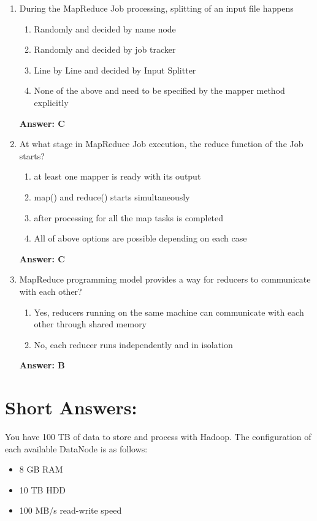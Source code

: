 \documentclass[12pt]{article}
\begin{document}
\begin{enumerate}
\item During the MapReduce Job processing, splitting of an input file happens
\begin{enumerate} 
\item Randomly and decided by name node
\item Randomly and decided by job tracker
\item Line by Line and decided by Input Splitter
\item None of the above and need to be specified by the mapper method explicitly
\end{enumerate} \textbf{Answer: C}
 
\item At what stage in MapReduce Job execution, the reduce function of the Job starts?
\begin{enumerate} 
\item at least one mapper is ready with its output
\item map() and reduce() starts simultaneously
\item after processing for all the map tasks is completed
\item All of above options are possible depending on each case
\end{enumerate} \textbf{Answer: C}

\item MapReduce programming model provides a way for reducers to communicate with each other? 
\begin{enumerate} 
\item Yes, reducers running on the same machine can communicate with each other through shared memory
\item No, each reducer runs independently and in isolation
\end{enumerate} \textbf{Answer: B}

\end{enumerate} \newpage

\section{Short Answers: }

You have 100 TB of data to store and process with Hadoop. The configuration of each available DataNode is as follows: \begin{itemize}
\item 8 GB RAM
\item 10 TB HDD 
\item 100 MB/s read-write speed \end{itemize} 
\end{document}
